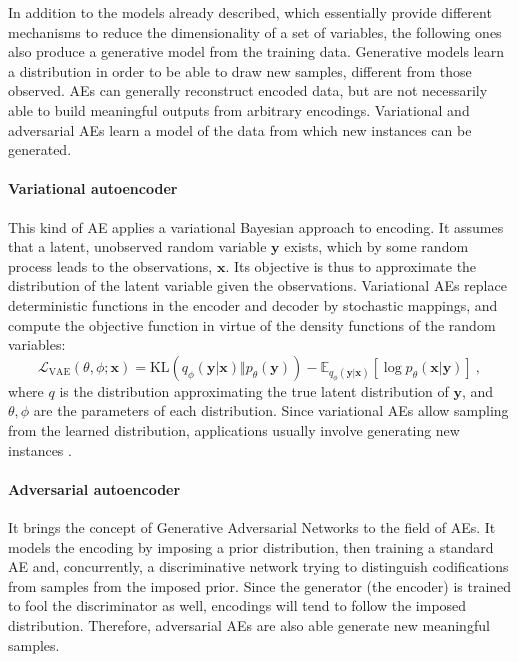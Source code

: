 In addition to the models already described, which essentially provide different mechanisms to reduce the dimensionality of a set of variables, the following ones also produce a generative model from the training data. Generative models learn a distribution in order to be able to draw new samples, different from those observed. AEs can generally reconstruct encoded data, but are not necessarily able to build meaningful outputs from arbitrary encodings. Variational and adversarial AEs learn a model of the data from which new instances can be generated.

\paragraph{Variational autoencoder \cite{VariationalAE}} This kind of AE applies a variational Bayesian \cite{VariationalBayes} approach to encoding. It assumes that a latent, unobserved random variable $\mathbf{y}$ exists, which by some random process leads to the observations, $\mathbf{x}$. Its objective is thus to approximate the distribution of the latent variable given the observations. Variational AEs replace deterministic functions in the encoder and decoder by stochastic mappings, and compute the objective function in virtue of the density functions of the random variables:
\begin{equation}
  \mathcal L_{\mathrm{VAE}}(\theta, \phi; \mathbf{x})=\mathrm{KL}(
  q_{\phi}(\mathbf{y}\vert\mathbf{x})
  \Vert
  p_{\theta}(\mathbf{y})
  )
  -
  \mathbb E_{  q_{\phi}(\mathbf{y}\vert\mathbf{x})}\left[\log p_{\theta}(\mathbf{x}\vert\mathbf{y})\right]~,
\end{equation}
where $q$ is the distribution approximating the true latent distribution of $\mathbf{y}$, and $\theta,\phi$ are the parameters of each distribution. Since variational AEs allow sampling from the learned distribution, applications usually involve generating new instances \cite{VAEgenerating,rezende2014stochastic}.

\paragraph{Adversarial autoencoder \cite{AdversarialAE}} It brings the concept of Generative Adversarial Networks \cite{GAN} to the field of AEs. It models the encoding by imposing a prior distribution, then training a standard AE and, concurrently, a discriminative network trying to distinguish codifications from samples from the imposed prior. Since the generator (the encoder) is trained to fool the discriminator as well, encodings will tend to follow the imposed distribution. Therefore, adversarial AEs are also able generate new meaningful samples. \\

